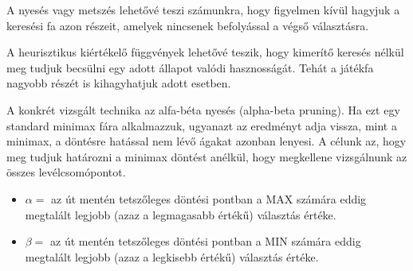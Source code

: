 A nyesés vagy metszés lehetővé teszi számunkra, hogy figyelmen kívül hagyjuk a
keresési fa azon részeit, amelyek nincsenek befolyással a végső választásra.

A heurisztikus kiértékelő függvények lehetővé teszik, hogy kimerítő keresés
nélkül meg tudjuk becsülni egy adott állapot valódi hasznosságát.  Tehát a
játékfa nagyobb részét is kihagyhatjuk adott esetben.

A konkrét vizsgált technika az alfa-béta nyesés (alpha-beta pruning). Ha ezt
egy standard minimax fára alkalmazzuk, ugyanazt az eredményt adja vissza, mint
a minimax, a döntésre hatással nem lévő ágakat azonban lenyesi.  A célunk az,
hogy meg tudjuk határozni a minimax döntést anélkül, hogy megkellene
vizsgálnunk az összes levélcsomópontot.

\begin{itemize}
    \item $\alpha =$ az út mentén tetszőleges döntési pontban a MAX számára eddig
        megtalált legjobb (azaz a legmagasabb értékű) választás értéke.
    \item $\beta =$ az út mentén tetszőleges döntési pontban a MIN számára eddig
        megtalált legjobb (azaz a legkisebb értékű) választás értéke.
\end{itemize}
